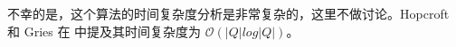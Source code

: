 \newpage
不幸的是，这个算法的时间复杂度分析是非常复杂的，这里不做讨论。Hopcroft 和 Gries 在 \cite{Grie73,Hopc71} 中提及其时间复杂度为 $ \mathcal{O}(|Q|log|Q|) $。


